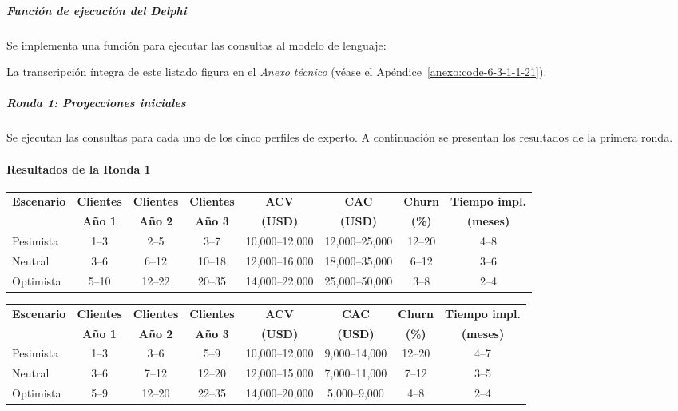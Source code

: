 \subparagraph{Función de ejecución del Delphi}

Se implementa una función para ejecutar las consultas al modelo de lenguaje:

La transcripción íntegra de este listado figura en el \textit{Anexo técnico} (véase el Apéndice~\ref{anexo:code-6-3-1-1-21}).

\subparagraph{Ronda 1: Proyecciones iniciales}

Se ejecutan las consultas para cada uno de los cinco perfiles de experto. A continuación se presentan los resultados de la primera ronda.

\paragraph{Resultados de la Ronda 1}

\begin{center}
\footnotesize
\begin{adjustbox}{max width=\textwidth}
\begin{tabular}{|l|c|c|c|c|c|c|c|}
\hline
\textbf{Escenario} & \textbf{Clientes} & \textbf{Clientes} & \textbf{Clientes} & \textbf{ACV} & \textbf{CAC} & \textbf{Churn} & \textbf{Tiempo impl.} \\
& \textbf{Año 1} & \textbf{Año 2} & \textbf{Año 3} & \textbf{(USD)} & \textbf{(USD)} & \textbf{(\%)} & \textbf{(meses)} \\
\hline
Pesimista & 1--3 & 2--5 & 3--7 & 10,000--12,000 & 12,000--25,000 & 12--20 & 4--8 \\
\hline
Neutral & 3--6 & 6--12 & 10--18 & 12,000--16,000 & 18,000--35,000 & 6--12 & 3--6 \\
\hline
Optimista & 5--10 & 12--22 & 20--35 & 14,000--22,000 & 25,000--50,000 & 3--8 & 2--4 \\
\hline
\end{tabular}
\end{adjustbox}
\end{center}

\begin{center}
\footnotesize
\begin{adjustbox}{max width=\textwidth}
\begin{tabular}{|l|c|c|c|c|c|c|c|}
\hline
\textbf{Escenario} & \textbf{Clientes} & \textbf{Clientes} & \textbf{Clientes} & \textbf{ACV} & \textbf{CAC} & \textbf{Churn} & \textbf{Tiempo impl.} \\
& \textbf{Año 1} & \textbf{Año 2} & \textbf{Año 3} & \textbf{(USD)} & \textbf{(USD)} & \textbf{(\%)} & \textbf{(meses)} \\
\hline
Pesimista & 1--3 & 3--6 & 5--9 & 10,000--12,000 & 9,000--14,000 & 12--20 & 4--7 \\
\hline
Neutral & 3--6 & 7--12 & 12--20 & 12,000--15,000 & 7,000--11,000 & 7--12 & 3--5 \\
\hline
Optimista & 5--9 & 12--20 & 22--35 & 14,000--20,000 & 5,000--9,000 & 4--8 & 2--4 \\
\hline
\end{tabular}
\end{adjustbox}
\end{center}


